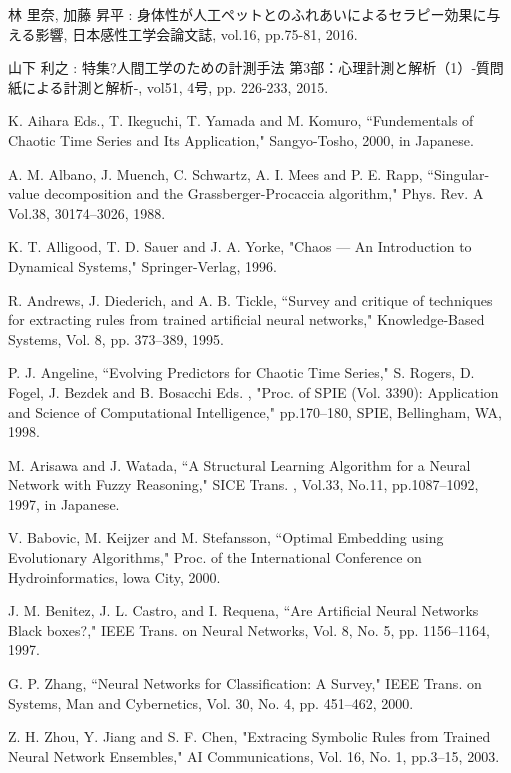 ﻿%


\begin{thebibliography}{99}

 林 里奈, 加藤 昇平 : 身体性が人工ペットとのふれあいによるセラピー効果に与える影響, 日本感性工学会論文誌, vol.16, pp.75-81, 2016.


 山下 利之 : 特集?人間工学のための計測手法 第3部：心理計測と解析（1）‐質問紙による計測と解析‐, vol51, 4号, pp. 226-233, 2015.


K. Aihara Eds., T. Ikeguchi, T. Yamada and M. Komuro, ``Fundementals of Chaotic Time Series and Its Application," Sangyo-Tosho, 2000, in Japanese.

 A. M. Albano, J. Muench, C. Schwartz, A. I. Mees and  P. E. Rapp, ``Singular-value decomposition and the Grassberger-Procaccia algorithm," Phys. Rev. A Vol.38, 30174--3026, 1988.

K. T. Alligood, T. D. Sauer and J. A. Yorke, "Chaos --- An Introduction to Dynamical Systems," Springer-Verlag, 1996.

R. Andrews, J. Diederich, and A. B. Tickle, ``Survey and critique of techniques for extracting rules from trained artificial neural networks," Knowledge-Based Systems, Vol. 8, pp. 373--389, 1995.

P. J. Angeline, ``Evolving Predictors for Chaotic Time Series," S. Rogers, D. Fogel, J. Bezdek and B. Bosacchi Eds. , "Proc. of SPIE (Vol. 3390): Application and Science of Computational Intelligence," pp.170--180, SPIE, Bellingham, WA, 1998. 

M. Arisawa and J. Watada, ``A Structural Learning Algorithm for a Neural Network with Fuzzy Reasoning," SICE Trans. , Vol.33, No.11, pp.1087--1092, 1997, in Japanese.

V. Babovic, M. Keijzer and M. Stefansson, ``Optimal Embedding using Evolutionary Algorithms," Proc. of the International Conference on Hydroinformatics, lowa City, 2000.

J. M. Benitez, J. L. Castro, and I. Requena, ``Are Artificial Neural Networks Black boxes?," IEEE Trans. on Neural Networks, Vol. 8, No. 5, pp. 1156--1164, 1997.

G. P. Zhang, ``Neural Networks for Classification: A Survey," IEEE Trans. on Systems, Man and Cybernetics, Vol. 30, No. 4, pp. 451--462, 2000.

Z. H. Zhou, Y. Jiang and S. F. Chen, "Extracing Symbolic Rules from Trained Neural Network Ensembles," AI Communications, Vol. 16, No. 1, pp.3--15, 2003. 


\end{thebibliography}

